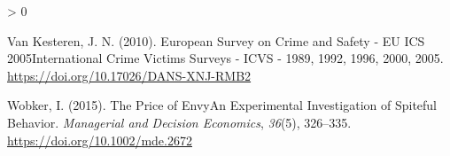\documentclass[
  english,
  man]{apa6}
\newlength{\cslhangindent}
\newenvironment{CSLReferences}[2] %
 {%
  \setlength{\parindent}{0pt}
  \ifodd #1 \everypar{\setlength{\hangindent}{\cslhangindent}}\ignorespaces\fi
  \ifnum #2 > 0
  \setlength{\parskip}{#2\baselineskip}
  \fi
 }%
 {}
\begin{document}
\begin{CSLReferences}{1}{0}
\leavevmode\hypertarget{ref-vankesteren2010}{}%
Van Kesteren, J. N. (2010). European Survey on Crime and Safety - EU ICS 2005International Crime Victims Surveys - ICVS - 1989, 1992, 1996, 2000, 2005. \url{https://doi.org/10.17026/DANS-XNJ-RMB2}

\leavevmode\hypertarget{ref-wobker2015}{}%
Wobker, I. (2015). The Price of Envy{{}}An Experimental Investigation of Spiteful Behavior. \emph{Managerial and Decision Economics}, \emph{36}(5), 326--335. \url{https://doi.org/10.1002/mde.2672}

\end{CSLReferences}

\endgroup
\end{document}
